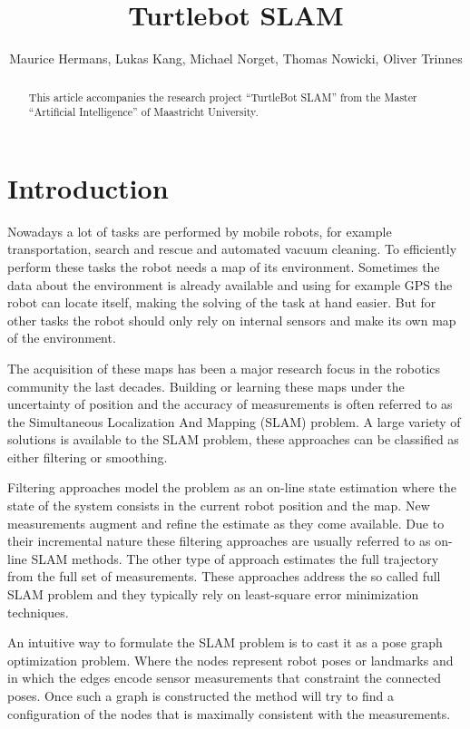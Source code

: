 \documentclass{ba-kecs}
\title{Turtlebot SLAM }
\author{Maurice Hermans, Lukas Kang, Michael Norget, Thomas Nowicki, Oliver Trinnes}
\begin{document}
\maketitle

\begin{abstract}
This article accompanies the research project ``TurtleBot SLAM'' from the Master ``Artificial Intelligence'' of Maastricht University.
\end{abstract}

\section{Introduction}
Nowadays a lot of tasks are performed by mobile robots, for example transportation, search and rescue and automated vacuum cleaning. To efficiently perform these tasks the robot needs a map of its environment. Sometimes the data about the environment is already available and using for example GPS the robot can locate itself, making the solving of the task at hand easier. But for other tasks the robot should only rely on internal sensors and make its own map of the environment.

The acquisition of these maps has been a major research focus in the robotics community the last decades. Building or learning these maps under the uncertainty of position and the accuracy of measurements is often referred to as the Simultaneous Localization And Mapping (SLAM) problem. A large variety of solutions is available to the SLAM problem, these approaches can be classified as either filtering or smoothing.

Filtering approaches model the problem as an on-line state estimation where the state of the system consists in the current robot position and the map. New measurements augment and refine the estimate as they come available. Due to their incremental nature these filtering approaches are usually referred to as on-line SLAM methods. The other type of approach estimates the full trajectory from the full set of measurements. These approaches address the so called full SLAM problem and they typically rely on least-square error minimization techniques.

An intuitive way to formulate the SLAM problem is to cast it as a pose graph optimization problem. Where the nodes represent robot poses or landmarks and in which the edges encode sensor measurements that constraint the connected poses. Once such a graph is constructed the method will try to find a configuration of the nodes that is maximally consistent with the measurements.
\end{document}
